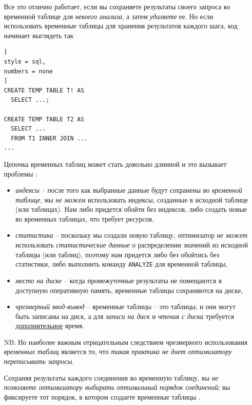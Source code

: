 \documentclass[%
	11pt,
	a4paper,
	utf8,
		]{article}
\begin{document}
Все это отлично работает, если вы сохраняете результаты своего запроса во временной таблице для \emph{некоего анализа}, а затем \emph{удаляете} ее. Но если использовать временные таблицы для хранения результатов каждого шага, код начинает выглядеть так
\begin{lstlisting}[
style = sql,
numbers = none
]
CREATE TEMP TABLE T! AS 
  SELECT ...;
  
CREATE TEMP TABLE T2 AS
  SELECT ...
  FROM T1 INNER JOIN ...
...
\end{lstlisting}

Цепочка временных таблиц может стать довольно длинной и это вызывает проблемы \cite[]{dombrovskaya:postgresql-2022}:
\begin{itemize}
	\item \emph{индексы} -- после того как выбранные данные будут сохранены во \emph{временной таблице}, {\color{red}мы \emph{не можем} использовать индексы, созданные в исходной таблице (или таблицах)}. Нам либо придется обойти без индексов, либо создать новые во временных таблицах, что требует ресурсов,
	
	\item \emph{статистика} -- поскольку мы создали новую таблицу, оптимизатор \emph{не может} использовать \emph{статистические данные} о распределении значений из исходной таблицы (или таблиц), поэтому нам придется либо без обойтись без статистики, либо выполнить команду \verb|ANALYZE| для временной таблицы,
	
	\item \emph{место на диске} -- когда промежуточные результаты не помещаются в доступную оперативную память, временные таблицы сохраняются на диске,
	
	\item \emph{чрезмерный ввод-вывод} -- временные таблицы -- это таблицы, и они могут быть записаны на диск, а для \emph{записи на диск} и \emph{чтения с диска} требуется \underline{дополнительное} время.
\end{itemize}

NB: Но наиболее важным отрицательным следствием чрезмерного использования \emph{временных таблиц} является то, что \emph{\color{red}такая практика не дает оптимизатору переписывать запросы}.

Сохраняя результаты каждого соединения во временную таблицу, вы {\color{red}\itshape не позволяете оптимизатору выбирать оптимальный порядок соединений}; вы фиксируете тот порядок, в котором создаете временные таблицы \cite[]{dombrovskaya:postgresql-2022}.
\end{document}
